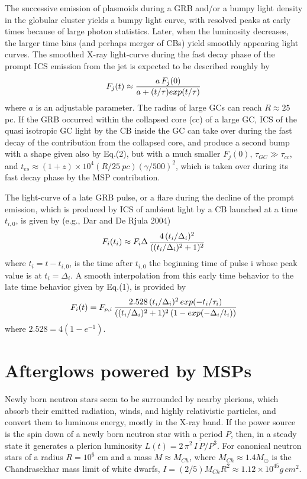 \documentclass[twocolumn]{aastex61}
\begin{document}
The successive emission of plasmoids during a GRB and/or a bumpy light 
density in the globular cluster yields a bumpy light curve, with resolved
peaks  at early times because of large photon statistics. 
Later, when the luminosity decreases, the larger time bins (and perhaps 
merger of CBs) yield smoothly appearing light curves. The 
smoothed X-ray light-curve during the fast decay phase of the prompt 
ICS emission from the jet is expected to be described roughly by
\begin{equation}
F_j(t)\approx {a\, F_j(0) \over a + (t/\tau) exp(t/\tau)}
\end{equation}
where $a$ is an adjustable parameter.
The radius of large GCs can reach  $R\approx 25$ pc.
If the GRB occurred within the collapsed core (cc) of a large GC,
ICS of the quasi isotropic GC light by the CB 
inside the GC can take over during the fast decay of the contribution from the 
collapsed core, and produce a second bump with a shape given also 
by Eq.(2), but with a much smaller $F_j(0)$, 
$\tau_{GC}\gg\tau_{cc}$, and $t_{es}\approx (1+z)\times 10^4 (R/25\ pc)(\gamma/500)^2$, 
which is taken over during its fast decay phase 
by the MSP contribution.

The light-curve of a late GRB pulse, or a flare during the decline of the 
prompt emission, which is produced by ICS of ambient light by a CB 
launched at a time $t_{i,0}$, is given by (e.g., Dar and De R\'jula 2004) 
\begin{equation}
 F_i(t_i)\approx F_i{\Delta}\,{4\,(t_i/\Delta_i)^2 \over
                ((t_i/\Delta_i)^2+1)^2}
\end{equation}
where $t_i = t-t_{i,0}$, is the time after $t_{i,0}$ 
the beginning time  of pulse i whose peak value 
is at $t_i=\Delta_i$.
A smooth interpolation from this early time behavior 
to the late time behavior given by Eq.(1), is provided by
\begin{equation}
F_i(t)= F_{p,i}\,{2.528\,(t_i/\Delta_i)^2\, exp(-t_i/\tau_i)
       \over ((t_i/\Delta_i)^2+1)^2\,(1 - exp(-\Delta_i/t_i))}
\end{equation}
where $2.528=4(1-e^{-1})$.


\section{Afterglows powered by MSPs}

Newly born neutron stars seem to be surrounded by nearby plerions, 
which absorb their emitted radiation, winds, and highly relativistic 
particles, and convert them to luminous energy, mostly in the X-ray 
band.  If the power source is the spin down of a newly born neutron 
star with a period $P$, then, in a steady state  it generates 
a plerion luminosity $L(t)= 2\,\pi^2\,I\,\dot{P}/P^3$. For canonical neutron 
stars of a radius $R=10^6$ cm and a mass $M\approx M_{Ch}$, where 
$M_{Ch}\approx 1.4 M_\odot$ is the Chandrasekhar mass limit of white 
dwarfs, $I=(2/5)M_{Ch} R^2\approx 1.12\times 10^{45} g\, cm^2$. 
\end{document}
